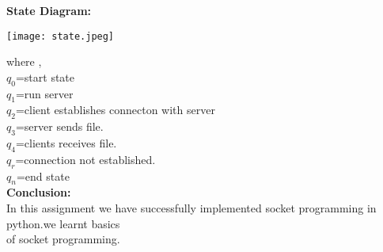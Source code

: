 \documentclass{article}
\begin{document}
\textbf{\large State Diagram: }\\
\begin{center}\texttt{[image: state.jpeg]}   \end{center}
where , \\
$q_0$=start state \\
$q_1$=run server \\
$q_2$=client establishes connecton with server \\
$q_3$=server sends file.\\
$q_4$=clients receives file.\\
$q_r$=connection not established.\\
$q_n$=end state\\[.75cm]
\textbf{\large Conclusion:}\\[.25cm]
In this assignment we have successfully implemented socket programming in python.we learnt basics\\
of socket programming.\\
\end{document}
